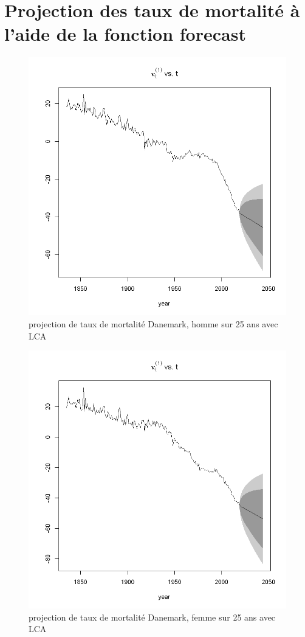 \section{Projection des taux de mortalité à l’aide de la fonction forecast}
\begin{figure}[!htb]
 \caption{projection de taux de mortalité Danemark, homme sur 25 ans avec LCA}
    \centering
    \includegraphics[scale =0.8]{output_24_1.png}
\end{figure}

\begin{figure}[!htb]
 \caption{projection de taux de mortalité Danemark, femme sur 25 ans avec LCA}
    \centering
    \includegraphics[scale =0.65]{output_24_2.png}
\end{figure}

